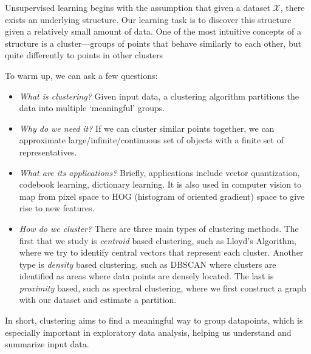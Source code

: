 %
%
%
%

Unsupervised learning begins with the assumption that given a dataset
$\mathcal{X}$, there exists an underlying structure. Our learning task
is to discover this structure given a relatively small amount of data.
One of the most intuitive concepts of a structure is a
cluster---groups of points that behave similarly to each other, but
quite differently to points in other clusters

To warm up, we can ask a few questions:
\begin{itemize}
\item \emph{What is clustering?} Given input
  data, a clustering algorithm partitions the data into multiple
  `meaningful' groups. 
\item \emph{Why do we need it?} If we can cluster similar points
  together, we can approximate large/infinite/continuous set of
  objects with a finite set of representatives.
\item \emph{What are its applications?} Briefly, applications include
  vector quantization, codebook learning, dictionary learning. It is
  also used in computer vision to map from pixel space to HOG
  (histogram of oriented gradient) space to give rise to new
  features.
\item \emph{How do we cluster?} There are three main types of
    clustering methods. The first that we study is \textit{centroid}
    based clustering, such as Lloyd's Algorithm, where we try to
    identify central vectors that represent each cluster. Another 
    type is \textit{density} based clustering, such as DBSCAN
    where clusters are identified as areas where data points are
    densely located. The last is \textit{proximity} based, such as
    spectral clustering, where we first construct a graph with our
    dataset and estimate a partition.
\end{itemize}
In short, clustering aims to find a meaningful way to group
datapoints, which is especially important in exploratory data
analysis, helping us understand and summarize input data.


